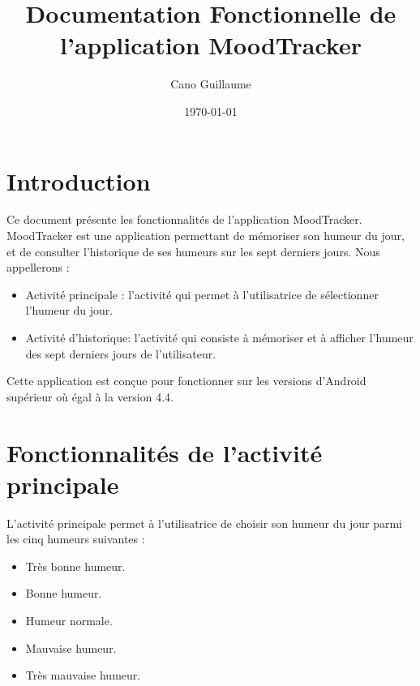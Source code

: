 \documentclass{article}[a4paper,12pt]
\title{\vfill Documentation Fonctionnelle de l'application MoodTracker}
\author{Cano Guillaume}
\date{\today\vfill}
\begin{document}
\maketitle
\newpage
\renewcommand{\contentsname}{Sommaire}
\tableofcontents
\newpage

\section{Introduction}

Ce document présente les fonctionnalités de l'application MoodTracker.
MoodTracker est une application permettant de mémoriser son humeur du jour,
et de consulter l'historique de ses humeurs sur les sept derniers jours.
Nous appellerons :

\begin{itemize}
\item Activité principale : l'activité qui permet à l'utilisatrice
  de sélectionner l'humeur du jour.
\item Activité d'historique: l'activité qui consiste à mémoriser et
  à afficher l'humeur des sept derniers jours de l'utilisateur.
\end{itemize}

\medskip

Cette application est conçue pour fonctionner sur les versions d'Android
supérieur où égal à la version 4.4.

\section{Fonctionnalités de l'activité principale}

L'activité principale permet à l'utilisatrice de choisir son humeur du jour parmi
les cinq humeurs suivantes :

\begin{itemize}
\item[] Très bonne humeur.
\item[] Bonne humeur.
\item[] Humeur normale.
\item[] Mauvaise humeur.
\item[] Très mauvaise humeur.
\end{itemize}
\end{document}
